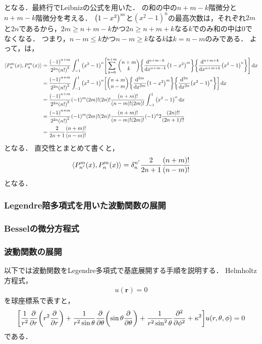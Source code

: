 \documentclass{report}
\begin{document}
      となる．最終行でLeibnizの公式を用いた．
      の和の中の$n + m - k$階微分と$n + m - k$階微分を考える．
      $\qty(1 - x^2)^m$と$(x^2 - 1)^n$の最高次数は，それぞれ$2m$と$2n$であるから，$2m \geq n + m - k$かつ$2n \geq n + m + k$なる$k$でのみ和の中は0でなくなる．
      つまり，$n - m\leq k$かつ$n - m \geq k$なる$k$は$k = n - m$のみである．
      よって，は，
      \begin{align}
        \inner{P_{n}^m(x)}{P_{n}^m(x)} &= \frac{\qty(-1)^{n + m}}{2^{2n}\qty(n!)^2}\int_{-1}^{1}\qty(x^2 - 1)^n\qty[\sum_{k = 0}^{n + m}\mqty(n + m \\ k)\qty{\dv[n + m - k]{x}\qty(1 - x^2)^m}\qty{\dv[n + m + k]{x}\qty(x^2 - 1)^n}] \dd{x} \\ 
        &= \frac{\qty(-1)^{n + m}}{2^{2n}\qty(n!)^2}\int_{-1}^{1}\qty(x^2 - 1)^n\qty[\mqty(n + m \\ n - m)\qty{\dv[2m]{x}\qty(1 - x^2)^m}\qty{\dv[2n]{x}\qty(x^2 - 1)^n}] \dd{x} \\ 
        &= \frac{\qty(-1)^{n + m}}{2^{2n}\qty(n!)^2}(-1)^m\qty(2m)!\qty(2n)!\frac{(n + m)!}{(n - m)!(2m)!}\int_{-1}^{1}\qty(x^2 - 1)^n\dd{x} \\ 
        &= \frac{\qty(-1)^{n + m}}{2^{2n}\qty(n!)^2}(-1)^m\qty(2m)!\qty(2n)!\frac{(n + m)!}{(n - m)!(2m)!}(-1)^n2\frac{(2n)!!}{(2n + 1)!!} \\ 
        &= \frac{2}{2n + 1}\frac{(n + m)!}{(n - m)!}
      \end{align}
      となる．
      直交性とまとめて書くと，
      \begin{align}
        \left\langle P_{n'}^m(x), P_{n}^m(x) \right\rangle = \delta_{n}^{n'}\frac{2}{2n + 1}\frac{(n + m)!}{(n - m)!}\label{pnm-norm}
      \end{align}
      となる．
    \subsubsection{Legendre陪多項式を用いた波動関数の展開}
      
    \subsubsection{Besselの微分方程式}
    \subsubsection{波動関数の展開}
    以下では波動関数をLegendre多項式で基底展開する手順を説明する．
    Helmholtz方程式，
    \begin{align}
      [\laplacian + \kappa^2]u(\bm{r}) = 0
    \end{align}
    を球座標系で表すと，
    \begin{align}
      \qty[\frac{1}{r^2}\pdv{r}\qty(r^2\pdv{r}) + \frac{1}{r^2 \sin \theta} \pdv{\theta}\qty(\sin\theta\pdv{\theta}) + \frac{1}{r^2 \sin^2\theta}\pdv[2]{\phi} + \kappa^2]u(r, \theta, \phi) = 0 \label{helmholtz-eq-in-sphere}
    \end{align}
    である．
\end{document}
